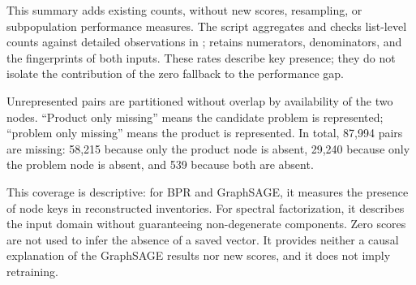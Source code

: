 This summary adds existing counts, without new scores, resampling, or subpopulation performance measures. The script  aggregates  and checks list-level counts against detailed observations in ;  retains numerators, denominators, and the fingerprints of both inputs. These rates describe key presence; they do not isolate the contribution of the zero fallback to the performance gap.

Unrepresented pairs are partitioned without overlap by availability of the two nodes. “Product only missing” means the candidate problem is represented; “problem only missing” means the product is represented. In total, 87,994 pairs are missing: 58,215 because only the product node is absent, 29,240 because only the problem node is absent, and 539 because both are absent.

\begin{table}[!htbp]\centering\small
\caption{B2, unrepresented candidate pairs by quarter and absent-node category; source: .}
\label{tab:maude-B2-missing}

\end{table}

\FloatBarrier
This coverage is descriptive: for BPR and GraphSAGE, it measures the presence of node keys in reconstructed inventories. For spectral factorization, it describes the input domain without guaranteeing non-degenerate components. Zero scores are not used to infer the absence of a saved vector. It provides neither a causal explanation of the GraphSAGE results nor new scores, and it does not imply retraining.
